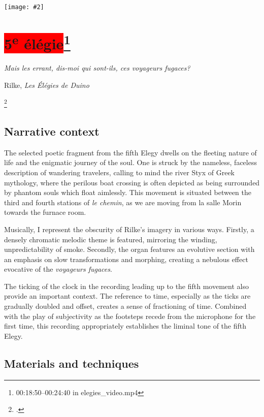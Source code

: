 \documentclass[12pt,twoside,maitrise]{dms_ks}
\newcommand{\customincludeexamples}[4][]{%
    \begin{example}[H]
        \centering
        \texttt{[image: \#2]}
        \caption{#4}
	\label{#3} 
    \end{example}
}
\theoremstyle{definition}
\begin{document}
{\customincludeexamples[width=\textwidth]{4e_6}{ex:4e_6}{The poetic fragment set over held pedal tones and a recording of \textit{la salle Morin} (p.~12 sys.~1).}

\section{\colorbox{red}{5\textsuperscript{e} élégie}\footnote{00:18:50--00:24:40 in elegies\_video.mp4}}

\epigraph{\textit{Mais les errant, dis-moi qui sont-ils, ces voyageurs fugaces?}}{Rilke, \textit{Les Élégies de Duino}\protect\footnotemark}

\footcitetext[47]{rilke_egies_1986}

\subsection{Narrative context}

The selected poetic fragment from the fifth Elegy dwells on the fleeting nature of life and the enigmatic journey of the soul. 
One is struck by the nameless, faceless description of wandering travelers, calling to mind the river Styx of Greek mythology, where the perilous boat crossing is often depicted as being surrounded by phantom souls which float aimlessly. 
This movement is situated between the third and fourth stations of \textit{le chemin}, as we are moving from la salle Morin towards the furnace room. 

Musically, I represent the obscurity of Rilke's imagery in various ways. 
Firstly, a densely chromatic melodic theme is featured, mirroring the winding, unpredictability of smoke. 
Secondly, the organ features an evolutive section with an emphasis on slow transformations and morphing, creating a nebulous effect evocative of the \textit{voyageurs fugaces}. 

The ticking of the clock in the recording leading up to the fifth movement also provide an important context. 
The reference to time, especially as the ticks are gradually doubled and offset, creates a sense of fractioning of time. 
Combined with the play of subjectivity as the footsteps recede from the microphone for the first time, this recording appropriately establishes the liminal tone of the fifth Elegy.

\subsection{Materials and techniques}

}
\end{document}
